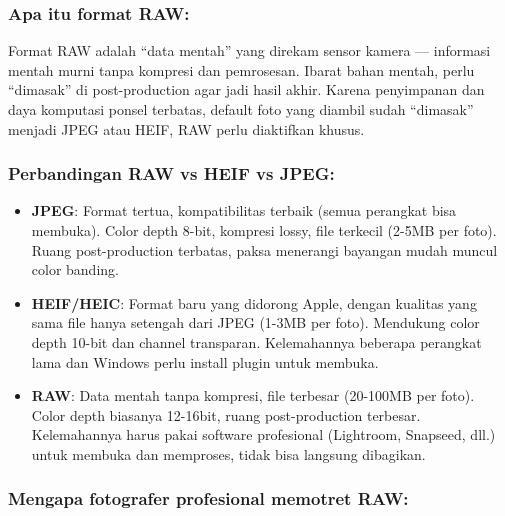 
\subsubsection*{Apa itu format RAW:}

Format RAW adalah “data mentah” yang direkam sensor kamera — informasi mentah murni tanpa kompresi dan pemrosesan. Ibarat bahan mentah, perlu “dimasak” di post-production agar jadi hasil akhir. Karena penyimpanan dan daya komputasi ponsel terbatas, default foto yang diambil sudah “dimasak” menjadi JPEG atau HEIF, RAW perlu diaktifkan khusus.

\subsubsection*{Perbandingan RAW vs HEIF vs JPEG:}

\begin{itemize}
  \item \textbf{JPEG}: Format tertua, kompatibilitas terbaik (semua perangkat bisa membuka). Color depth 8-bit, kompresi lossy, file terkecil (2-5MB per foto). Ruang post-production terbatas, paksa menerangi bayangan mudah muncul color banding.
  \item \textbf{HEIF/HEIC}: Format baru yang didorong Apple, dengan kualitas yang sama file hanya setengah dari JPEG (1-3MB per foto). Mendukung color depth 10-bit dan channel transparan. Kelemahannya beberapa perangkat lama dan Windows perlu install plugin untuk membuka.
  \item \textbf{RAW}: Data mentah tanpa kompresi, file terbesar (20-100MB per foto). Color depth biasanya 12-16bit, ruang post-production terbesar. Kelemahannya harus pakai software profesional (Lightroom, Snapseed, dll.) untuk membuka dan memproses, tidak bisa langsung dibagikan.
\end{itemize}

\subsubsection*{Mengapa fotografer profesional memotret RAW:}

